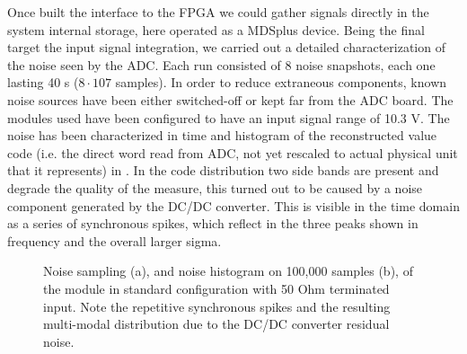 Once built the interface to the FPGA we could gather signals directly in the system internal storage, here operated as a MDSplus device.
Being the final target the input signal integration, we carried out a detailed characterization of the noise seen by the ADC. Each run consisted of 8 noise snapshots, each one lasting 40 s ($8\cdot107$ samples). In order to reduce extraneous components, known noise sources have been either switched-off or kept far from the ADC board. The modules used have been configured to have an input signal range of 10.3 V.
The noise has been characterized in time \Figure{\ref{fig:dcdc_noise_a}} and histogram of the reconstructed value code (i.e. the direct word read from ADC, not yet rescaled to actual physical unit that it represents) in \Figure{\ref{fig:dcdc_noise_b}}. 
In the code distribution two side bands are present and degrade the quality of the measure, this turned out to be caused by a noise component generated by the DC/DC converter. This is visible in the time domain as a series of synchronous spikes, which reflect in the three peaks shown in frequency and the overall larger sigma.
%
\begin{figure}[ht]
\centering
{}
\caption{Noise sampling (a), and noise histogram on 100,000 samples (b), of the module in standard configuration with 50 Ohm terminated input. Note the repetitive synchronous spikes and the resulting multi-modal distribution due to the DC/DC converter residual noise.}
\label{fig:dcdc_noise}
\end{figure}

